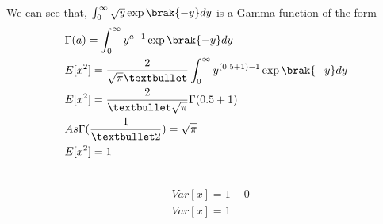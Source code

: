 \documentclass[journal,12pt,twocolumn]{IEEEtran}
\renewcommand\thesection{\arabic{section}}
\begin{document}
\\
We can see that, $\int_{0}^{\infty}\sqrt{y}\exp\brak{-y}dy$ is a Gamma function of the form
\begin{align*}
&\Gamma(a)= \int_{0}^{\infty}{y}^{a-1}\exp\brak{-y}dy
\\
&E[x^2]=\frac{2}{\sqrt{\pi}•}\int_{0}^{\infty}{y}^{(0.5+1)-1}\exp\brak{-y}dy
\\
& E[x^2]=\frac{2}{•\sqrt{\pi}}\Gamma(0.5+1)
\\
& As \Gamma(\frac{1}{•2})=\sqrt{\pi}
\\
&E[x^2]=1
\end{align*}
\\
\begin{align*}
\\
&Var[x]=1-0
\\
&Var[x]=1
\end{align*}





%

%
%
\end{document}
